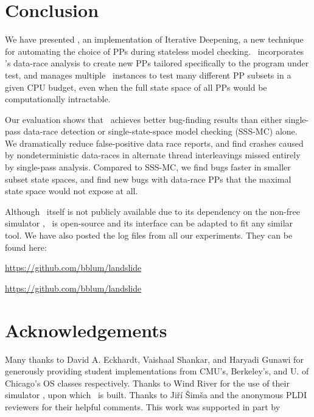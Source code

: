 \documentclass[pldi]{sigplanconf-pldi15}
\begin{document}







\section{Conclusion}


We have presented \quicksand, an implementation of Iterative Deepening, a new technique for automating the choice of PPs during stateless model checking.
\quicksand~incorporates \landslide's data-race analysis to create new PPs tailored specifically to the program under test,
and manages multiple \landslide~instances to test many different PP subsets in a given CPU budget, even when the full state space of all PPs would be computationally intractable.

Our evaluation shows that \quicksand~achieves better bug-finding results than either single-pass data-race detection or single-state-space model checking (SSS-MC) alone.
We dramatically reduce false-positive data race reports,
and find crashes caused by nondeterministic data-races in alternate thread interleavings missed entirely by single-pass analysis.
Compared to SSS-MC, we find bugs faster in smaller subset state spaces,
and find new bugs with data-race PPs that the maximal state space would not expose at all.

Although \landslide~itself is not publicly available due to its dependency on the non-free simulator \simics, \quicksand~is open-source and its interface can be adapted to fit any similar tool.
We have also posted the log files from all our experiments.
They can be found here:

\url{https://github.com/bblum/landslide} %

\url{https://github.com/bblum/landslide} %

\section{Acknowledgements}

Many thanks to David A. Eckhardt, Vaishaal Shankar, and Haryadi Gunawi for generously providing student implementations from CMU's, Berkeley's, and U. of Chicago's OS classes respectively.
Thanks to Wind River for the use of their simulator \simics, upon which \landslide~is built.
Thanks to Ji\v{r}\'{i} \v{S}im\v{s}a and the anonymous PLDI reviewers for their helpful comments.
This work was supported in part by %



{}
\end{document}
